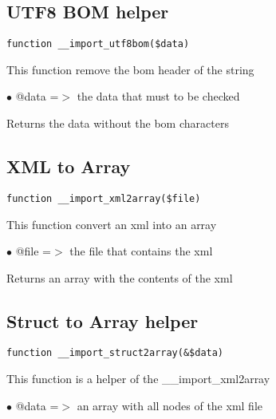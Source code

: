 \documentclass[a4paper]{book}
\begin{document}
\hypertarget{toc143}{}
\subsection{UTF8 BOM helper}

\begin{lstlisting}
function __import_utf8bom($data)
\end{lstlisting}

This function remove the bom header of the string

\begin{compactitem}
\item[\color{myblue}$\bullet$] @data =$>$ the data that must to be checked
\end{compactitem}

Returns the data without the bom characters

\hypertarget{toc144}{}
\subsection{XML to Array}

\begin{lstlisting}
function __import_xml2array($file)
\end{lstlisting}

This function convert an xml into an array

\begin{compactitem}
\item[\color{myblue}$\bullet$] @file =$>$ the file that contains the xml
\end{compactitem}

Returns an array with the contents of the xml

\hypertarget{toc145}{}
\subsection{Struct to Array helper}

\begin{lstlisting}
function __import_struct2array(&$data)
\end{lstlisting}

This function is a helper of the \_\_import\_xml2array

\begin{compactitem}
\item[\color{myblue}$\bullet$] @data =$>$ an array with all nodes of the xml file
\end{compactitem}
\end{document}
